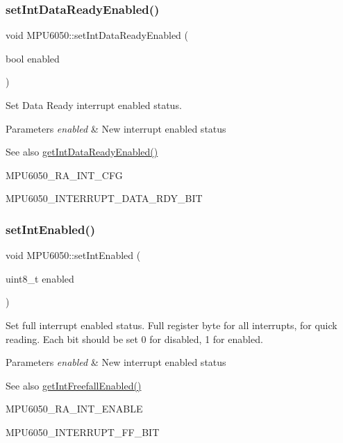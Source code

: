 \subsubsection{\texorpdfstring{setIntDataReadyEnabled()}{setIntDataReadyEnabled()}}
{\footnotesize\ttfamily void M\+P\+U6050\+::set\+Int\+Data\+Ready\+Enabled (\begin{DoxyParamCaption}\item[{bool}]{enabled }\end{DoxyParamCaption})}

Set Data Ready interrupt enabled status. 
\begin{DoxyParams}{Parameters}
{\em enabled} & New interrupt enabled status \\
\hline
\end{DoxyParams}
\begin{DoxySeeAlso}{See also}
\mbox{\hyperlink{class_m_p_u6050_ae15f6043a74c9c9bf9754824802ce8d3}{get\+Int\+Data\+Ready\+Enabled()}} 

M\+P\+U6050\+\_\+\+R\+A\+\_\+\+I\+N\+T\+\_\+\+C\+FG 

M\+P\+U6050\+\_\+\+I\+N\+T\+E\+R\+R\+U\+P\+T\+\_\+\+D\+A\+T\+A\+\_\+\+R\+D\+Y\+\_\+\+B\+IT 
\end{DoxySeeAlso}
\mbox{\label{class_m_p_u6050_ac7bcf24249dd5000320a8ec0ffe488c6}} 
\subsubsection{\texorpdfstring{setIntEnabled()}{setIntEnabled()}}
{\footnotesize\ttfamily void M\+P\+U6050\+::set\+Int\+Enabled (\begin{DoxyParamCaption}\item[{uint8\+\_\+t}]{enabled }\end{DoxyParamCaption})}

Set full interrupt enabled status. Full register byte for all interrupts, for quick reading. Each bit should be set 0 for disabled, 1 for enabled. 
\begin{DoxyParams}{Parameters}
{\em enabled} & New interrupt enabled status \\
\hline
\end{DoxyParams}
\begin{DoxySeeAlso}{See also}
\mbox{\hyperlink{class_m_p_u6050_a500bb2df2e46eaecd3fb2ba7304a5ed3}{get\+Int\+Freefall\+Enabled()}} 

M\+P\+U6050\+\_\+\+R\+A\+\_\+\+I\+N\+T\+\_\+\+E\+N\+A\+B\+LE 

M\+P\+U6050\+\_\+\+I\+N\+T\+E\+R\+R\+U\+P\+T\+\_\+\+F\+F\+\_\+\+B\+IT 
\end{DoxySeeAlso}
\mbox{\label{class_m_p_u6050_a9d9d6aeea346e6f6fad8e4a428cf3301}} 
